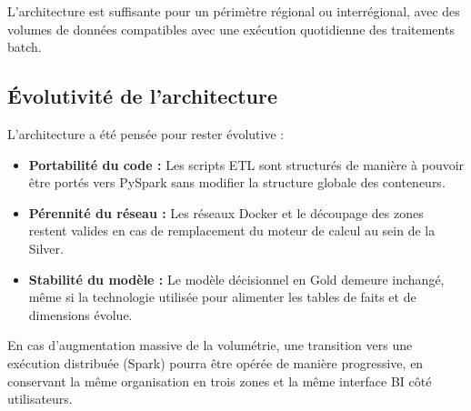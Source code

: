 \documentclass[12pt, a4paper]{report}
\begin{document}
L'architecture est suffisante pour un périmètre régional ou interrégional, avec des volumes de données compatibles avec une exécution quotidienne des traitements batch.

\subsection{Évolutivité de l’architecture}

L’architecture a été pensée pour rester évolutive :

\begin{itemize}[leftmargin=1.2cm, label=\textcolor{chuBlue}{\textbullet}]
    \item \textbf{Portabilité du code :} Les scripts ETL sont structurés de manière à pouvoir être portés vers PySpark sans modifier la structure globale des conteneurs.
    \item \textbf{Pérennité du réseau :} Les réseaux Docker et le découpage des zones restent valides en cas de remplacement du moteur de calcul au sein de la Silver.
    \item \textbf{Stabilité du modèle :} Le modèle décisionnel en Gold demeure inchangé, même si la technologie utilisée pour alimenter les tables de faits et de dimensions évolue.
\end{itemize}

En cas d’augmentation massive de la volumétrie, une transition vers une exécution distribuée (Spark) pourra être opérée de manière progressive, en conservant la même organisation en trois zones et la même interface BI côté utilisateurs.
\end{document}
